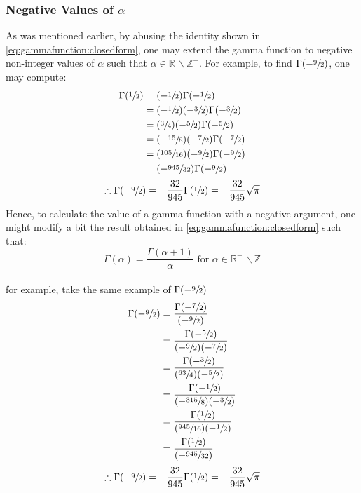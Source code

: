 \documentclass[12pt]{article}
\begin{document}
\subsubsection{Negative Values of $\alpha$}
As was mentioned earlier, by abusing the identity shown in \autoref{eq:gammafunction:closedform}, one may extend the
gamma function to negative non-integer values of $\alpha$ such that $\alpha\in\mathbb{R}\,\backslash\mathbb{Z}^-$. For
example, to find $\Gamma(-\sfrac{9}{2})$, one may compute:
\vspace*{-12pt}
\begin{equation}
	\begin{split}
		\Gamma(\sfrac{1}{2})	&=	(-\sfrac{1}{2})\Gamma(-\sfrac{1}{2})\\
								&=	(-\sfrac{1}{2})(-\sfrac{3}{2})\Gamma(-\sfrac{3}{2})\\
								&=	(\sfrac{3}{4})(-\sfrac{5}{2})\Gamma(-\sfrac{5}{2})\\
								&=	(-\sfrac{15}{8})(-\sfrac{7}{2})\Gamma(-\sfrac{7}{2})\\
								&=	(\sfrac{105}{16})(-\sfrac{9}{2})\Gamma(-\sfrac{9}{2})\\
								&=	(-\sfrac{945}{32})\Gamma(-\sfrac{9}{2})\\
	\end{split}
\end{equation}
\begin{equation}
	\therefore\Gamma(-\sfrac{9}{2})=-\frac{32}{945}\Gamma(\sfrac{1}{2})=-\frac{32}{945}\sqrt{\pi}
\end{equation}
Hence, to calculate the value of a gamma function with a negative argument, one might modify a bit the result obtained
in \autoref{eq:gammafunction:closedform} such that:
\vspace*{-12pt}
\begin{equation}
	\Gamma(\alpha)=\frac{\Gamma(\alpha+1)}{\alpha}\text{ for }\alpha\in\mathbb{R}^-\,\backslash\mathbb{Z}
\end{equation}\\[-36pt]
for example, take the same example of $\Gamma(-\sfrac{9}{2})$\\[-12pt]
\begin{equation}
	\begin{split}
		\Gamma(-\sfrac{9}{2})	&=	\frac{\Gamma(-\sfrac{7}{2})}{(-\sfrac{9}{2})}\\
								&=	\frac{\Gamma(-\sfrac{5}{2})}{(-\sfrac{9}{2})(-\sfrac{7}{2})}\\
								&=	\frac{\Gamma(-\sfrac{3}{2})}{(\sfrac{63}{4})(-\sfrac{5}{2})}\\
								&=	\frac{\Gamma(-\sfrac{1}{2})}{(-\sfrac{315}{8})(-\sfrac{3}{2})}\\
								&=	\frac{\Gamma(\sfrac{1}{2})}{(\sfrac{945}{16})(-\sfrac{1}{2})}\\
								&=	\frac{\Gamma(\sfrac{1}{2})}{(-\sfrac{945}{32})}
		\end{split}
\end{equation}
\begin{equation}
	\therefore\Gamma(-\sfrac{9}{2})=-\frac{32}{945}\Gamma(\sfrac{1}{2})=-\frac{32}{945}\sqrt{\pi}
\end{equation}
\end{document}
